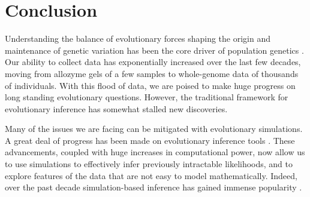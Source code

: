 \chapter{Conclusion}

Understanding the balance of evolutionary forces shaping the origin and maintenance of genetic variation has been the core driver of population genetics \citep{lewontin_genetic_1974}.
Our ability to collect data has exponentially increased over the last few decades, moving from allozyme gels of a few samples to whole-genome data of thousands of individuals.
With this flood of data, we are poised to make huge progress on long standing evolutionary questions.
However, the traditional framework for evolutionary inference has somewhat stalled new discoveries.

Many of the issues we are facing can be mitigated with evolutionary simulations.
A great deal of progress has been made on evolutionary inference tools \citep{haller_slim_2019,kelleher_efficient_2016, haller_tree-sequence_2019,adrion_community-maintained_2020}.
These advancements, coupled with huge increases in computational power, now allow us to use simulations to effectively infer previously intractable likelihoods,
and to explore features of the data that are not easy to model mathematically.
Indeed, over the past decade simulation-based inference has gained immense popularity \citep{schrider_shic_2016,torres_human_2018,caldas_inference_2022,chan_likelihood-free_2018,korfmann_simultaneous_2023}.


